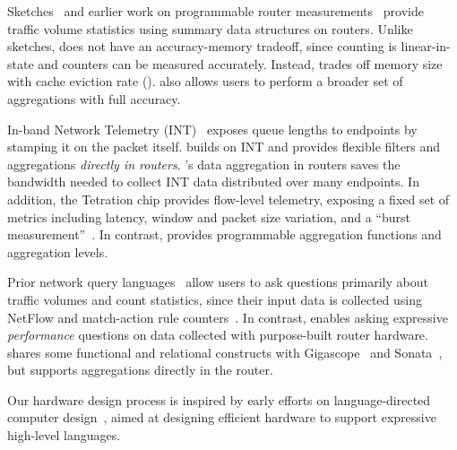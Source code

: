  Sketches~\cite{univmon, flowradar, counterbraids, dream} and
earlier work on programmable router measurements~\cite{progme, opensketch}
provide traffic volume statistics using summary data structures on routers.
Unlike sketches, \TheSystem does not have an accuracy-memory tradeoff, since
counting is linear-in-state and counters can be measured accurately. Instead,
\TheSystem trades off memory size with cache eviction rate ().
\TheSystem also allows users to perform a broader set of aggregations with full
accuracy.


%

In-band Network Telemetry (INT)~\cite{int, tpp} exposes queue lengths to
endpoints by stamping it on the packet itself. \TheSystem builds on INT and
provides flexible filters and aggregations {\em directly in routers}.
\TheSystem's data aggregation in routers saves the bandwidth needed to collect
INT data distributed over many endpoints.  In addition, the Tetration chip
provides flow-level telemetry, exposing a fixed set of metrics including
latency, window and packet size variation, and a ``burst
measurement''~\cite{tetration-telemetry}. In contrast, \TheSystem provides
programmable aggregation functions and aggregation levels.%

 Prior network query languages~\cite{gigascope,
frenetic, path_query, streaming-monitoring} allow users to ask questions
primarily about traffic volumes and count statistics, since their input data is
collected using NetFlow and match-action rule counters~\cite{openflow}. In
contrast, \TheSystem enables asking expressive {\em performance} questions on
data collected with purpose-built router hardware. \TheSystem shares some
functional and relational constructs with Gigascope~\cite{gigascope} and
Sonata~\cite{streaming-monitoring}, but supports aggregations directly in the
router.

Our hardware design process is inspired by early efforts on language-directed
computer design~\cite{language-directed-computer-design, ditzel_patterson,
soar}, aimed at designing efficient hardware to support expressive high-level
languages.
